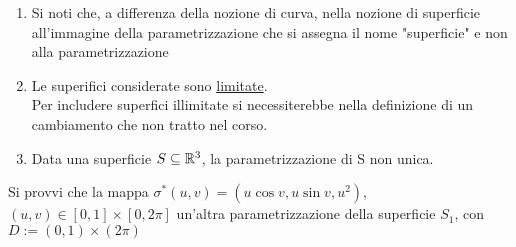 \begin{osservazione}
  \begin{enumerate}
    \item Si noti che, a differenza della nozione di curva, nella nozione di superficie \ace all'immagine
          della parametrizzazione che si assegna il nome "superficie" e non alla parametrizzazione
    \item Le superifici considerate sono \underline{limitate}. \\
          Per includere superfici illimitate si necessiterebbe nella definizione di un cambiamento 
          che non \ace tratto nel corso.
    \item Data una superficie $S\subseteq\mathbb{R}^3$, la parametrizzazione di S non \ace unica.
  \end{enumerate}
\end{osservazione}
\begin{exercise}
  Si provvi che la mappa 
  $\sigma^*(u,v) = (u\cos{v},u\sin{v}, u^2)$, $(u,v)\in[0,1]\times[0,2\pi]$
  \ace un'altra parametrizzazione della superficie $S_1$, con $D:= (0,1)\times(2\pi)$
\end{exercise}
